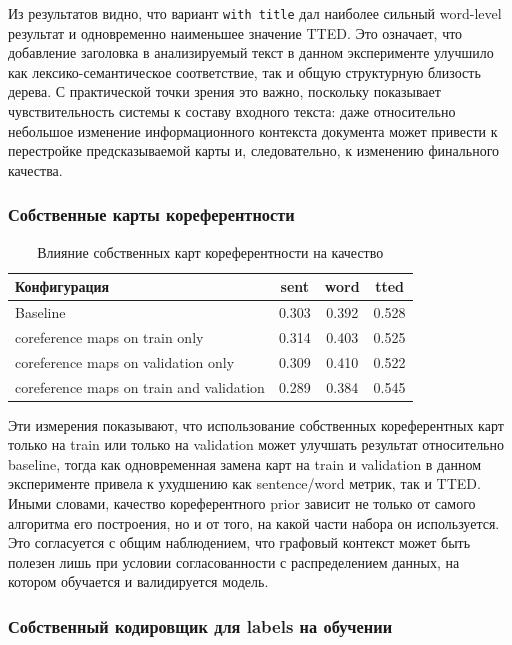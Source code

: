 \documentclass[12pt,a4paper]{article}
\begin{document}
Из результатов видно, что вариант \texttt{with title} дал наиболее сильный word-level
результат и одновременно наименьшее значение TTED. Это означает, что добавление заголовка
в анализируемый текст в данном эксперименте улучшило как лексико-семантическое
соответствие, так и общую структурную близость дерева. С практической точки зрения
это важно, поскольку показывает чувствительность системы к составу входного текста:
даже относительно небольшое изменение информационного контекста документа может
привести к перестройке предсказываемой карты и, следовательно, к изменению
финального качества.

\subsubsection{Собственные карты кореферентности}

\begin{table}[H]
\centering
\caption{Влияние собственных карт кореферентности на качество}
\begin{tabular}{lccc}
\toprule
Конфигурация & sent & word & tted \\
\midrule
Baseline & 0.303 & 0.392 & 0.528 \\
coreference maps on train only & 0.314 & 0.403 & 0.525 \\
coreference maps on validation only & 0.309 & 0.410 & 0.522 \\
coreference maps on train and validation & 0.289 & 0.384 & 0.545 \\
\bottomrule
\end{tabular}
\end{table}

Эти измерения показывают, что использование собственных кореферентных карт только на
train или только на validation может улучшать результат относительно baseline, тогда как
одновременная замена карт на train и validation в данном эксперименте привела к ухудшению
как sentence/word метрик, так и TTED. Иными словами, качество кореферентного prior
зависит не только от самого алгоритма его построения, но и от того, на какой части
набора он используется. Это согласуется с общим наблюдением, что графовый контекст
может быть полезен лишь при условии согласованности с распределением данных, на
котором обучается и валидируется модель.

\subsubsection{Собственный кодировщик для labels на обучении}
\end{document}
